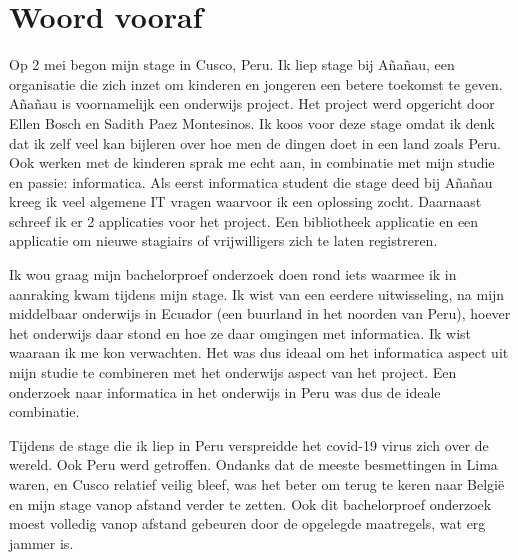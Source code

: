 
\chapter*{Woord vooraf}
\label{ch:voorwoord}


Op 2 mei begon mijn stage in Cusco, Peru. Ik liep stage bij Añañau, een organisatie die zich inzet om kinderen en jongeren een betere toekomst te geven. Añañau is voornamelijk een onderwijs project. Het project werd opgericht door Ellen Bosch en Sadith Paez Montesinos. Ik koos voor deze stage omdat ik denk dat ik zelf veel kan bijleren over hoe men de dingen doet in een land zoals Peru. Ook werken met de kinderen sprak me echt aan, in combinatie met mijn studie en passie: informatica. Als eerst informatica student die stage deed bij Añañau kreeg ik veel algemene IT vragen waarvoor ik een oplossing zocht. Daarnaast schreef ik er 2 applicaties voor het project. Een bibliotheek applicatie en een applicatie om nieuwe stagiairs of vrijwilligers zich te laten registreren. 

Ik wou graag mijn bachelorproef onderzoek doen rond iets waarmee ik in aanraking kwam tijdens mijn stage. Ik wist van een eerdere uitwisseling, na mijn middelbaar onderwijs in Ecuador (een buurland in het noorden van Peru), hoever het onderwijs daar stond en hoe ze daar omgingen met informatica. Ik wist waaraan ik me kon verwachten. Het was dus ideaal om het informatica aspect uit mijn studie te combineren met het onderwijs aspect van het project. Een onderzoek naar informatica in het onderwijs in Peru was dus de ideale combinatie.

Tijdens de stage die ik liep in Peru verspreidde het covid-19 virus zich over de wereld. Ook Peru werd getroffen. Ondanks dat de meeste besmettingen in Lima waren, en Cusco relatief veilig bleef, was het beter om terug te keren naar België en mijn stage vanop afstand verder te zetten. Ook dit bachelorproef onderzoek moest volledig vanop afstand gebeuren door de opgelegde maatregels, wat erg jammer is.

